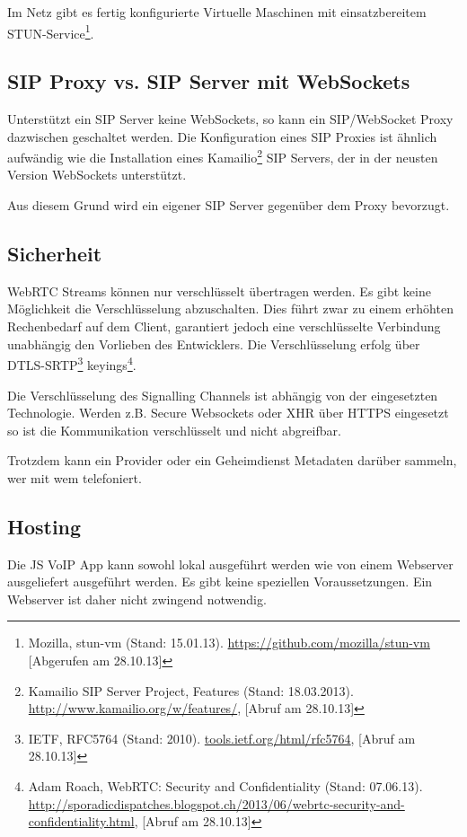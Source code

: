 		Im Netz gibt es fertig konfigurierte Virtuelle Maschinen mit einsatzbereitem STUN-Service\footnote{Mozilla, stun-vm (Stand: 15.01.13). \hyperlink{https://github.com/mozilla/stun-vm}{https://github.com/mozilla/stun-vm} [Abgerufen am 28.10.13]}.

	\subsection{SIP Proxy vs. SIP Server mit WebSockets}
		Unterstützt ein SIP Server keine WebSockets, so kann ein SIP/WebSocket Proxy dazwischen geschaltet werden. Die Konfiguration eines SIP Proxies ist ähnlich aufwändig wie die Installation eines Kamailio\footnote{Kamailio SIP Server Project, Features (Stand: 18.03.2013). \hyperlink{http://www.kamailio.org/w/features/}{http://www.kamailio.org/w/features/}, [Abruf am 28.10.13]} SIP Servers, der in der neusten Version WebSockets unterstützt.

		Aus diesem Grund wird ein eigener SIP Server gegenüber dem Proxy bevorzugt.

	\subsection{Sicherheit}
		WebRTC Streams können nur verschlüsselt übertragen werden. Es gibt keine Möglichkeit die Verschlüsselung abzuschalten. Dies führt zwar zu einem erhöhten Rechenbedarf auf dem Client, garantiert jedoch eine verschlüsselte Verbindung unabhängig den Vorlieben des Entwicklers.
		Die Verschlüsselung erfolg über DTLS-SRTP\footnote{IETF, RFC5764 (Stand: 2010). \hyperlink{http://tools.ietf.org/html/rfc5764}{tools.ietf.org/html/rfc5764}, [Abruf am 28.10.13]} keyings\footnote{Adam Roach, WebRTC: Security and Confidentiality (Stand: 07.06.13). \hyperlink{http://sporadicdispatches.blogspot.ch/2013/06/webrtc-security-and-confidentiality.html}{http://sporadicdispatches.blogspot.ch/2013/06/webrtc-security-and-confidentiality.html}, [Abruf am 28.10.13]}. 
		
		Die Verschlüsselung des Signalling Channels ist abhängig von der eingesetzten Technologie. Werden z.B. Secure Websockets oder XHR über HTTPS eingesetzt so ist die Kommunikation verschlüsselt und nicht abgreifbar.
		
		Trotzdem kann ein Provider oder ein Geheimdienst Metadaten darüber sammeln, wer mit wem telefoniert.
		  
	\subsection{Hosting}
		Die JS VoIP App kann sowohl lokal ausgeführt werden wie von einem Webserver ausgeliefert ausgeführt werden. Es gibt keine speziellen Voraussetzungen. Ein Webserver ist daher nicht zwingend notwendig.
	
